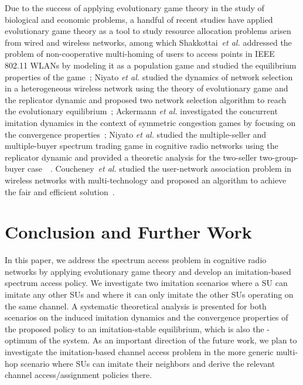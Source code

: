 \documentclass[12pt, onecolumn]{IEEEtran}
\theoremstyle{plain}
\theoremstyle{definition}
\begin{document}
Due to the success of applying evolutionary game theory in the study of biological and economic problems, a handful of recent studies have applied evolutionary game theory as a tool to study resource allocation problems arisen from wired and wireless networks, among which Shakkottai~\textit{et al.} addressed the problem of non-cooperative multi-homing of users to access points in IEEE 802.11 WLANs by modeling it as a population game and studied the equilibrium properties of the game~\cite{Shakkottai07}; Niyato \textit{et al.} studied the dynamics of network selection in a heterogeneous wireless network using the theory of evolutionary game and the replicator dynamic and proposed two network selection algorithm to reach the evolutionary equilibrium~\cite{Niyato09}; Ackermann \textit{et al.} investigated the concurrent imitation dynamics in the context of symmetric congestion games by focusing on the convergence properties~\cite{Ackermann09}; Niyato \textit{et al.} studied the multiple-seller and multiple-buyer spectrum trading game in cognitive radio networks using the replicator dynamic and provided a theoretic analysis for the two-seller two-group-buyer case~~\cite{Niyato09b}. Coucheney~\textit{et al.} studied the user-network association problem in wireless networks with multi-technology and proposed an algorithm to achieve the fair and efficient solution~\cite{Cou09}.


\section{Conclusion and Further Work}
\label{sec:conclusion}

In this paper, we address the spectrum access problem in cognitive radio networks by applying evolutionary game theory and develop an imitation-based
spectrum access policy. We investigate two imitation scenarios where a SU can imitate any other SUs and where it can only imitate the other SUs operating
on the same channel. A systematic theoretical analysis is presented for both scenarios on the induced imitation
dynamics and the convergence properties of the proposed policy to an imitation-stable equilibrium, which is also the -optimum of the system.
As an important direction of the future work, we plan to investigate the imitation-based channel access problem in the more generic multi-hop scenario where SUs can imitate their neighbors and derive the relevant channel access/assignment policies there.
\end{document}
